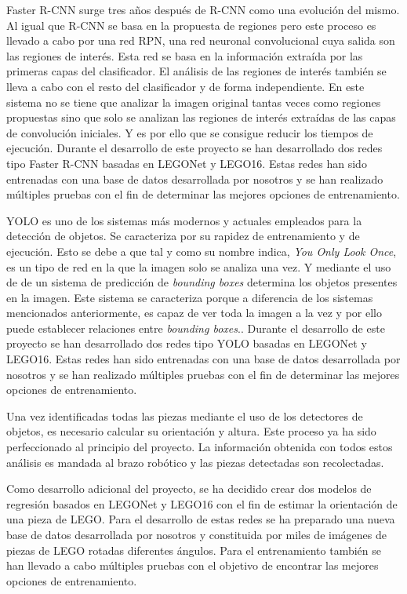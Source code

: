 {Faster R-CNN surge tres años después de R-CNN como una evolución del mismo. Al igual que R-CNN se basa en la propuesta de regiones pero este proceso es llevado a cabo por una red RPN, una red neuronal convolucional cuya salida son las regiones de interés. Esta red se basa en la información extraída por las primeras capas del clasificador. El análisis de las regiones de interés también se lleva a cabo con el resto del clasificador y de forma independiente. En este sistema no se tiene que analizar la imagen original tantas veces como regiones propuestas sino que solo se analizan las regiones de interés extraídas de las capas de convolución iniciales. Y es por ello que se consigue reducir los tiempos de ejecución. Durante el desarrollo de este proyecto se han desarrollado dos redes tipo Faster R-CNN basadas en LEGONet y LEGO16. Estas redes han sido entrenadas con una base de datos desarrollada por nosotros y se han realizado múltiples pruebas con el fin de determinar las mejores opciones de entrenamiento.

YOLO es uno de los sistemas más modernos y actuales empleados para la detección de objetos. Se caracteriza por su rapidez de entrenamiento y de ejecución. Esto se debe a que tal y como su nombre indica, \textit{You Only Look Once}, es un tipo de red en la que la imagen solo se analiza una vez. Y mediante el uso de de un sistema de predicción de \textit{bounding boxes} determina los objetos presentes en la imagen. Este sistema se caracteriza porque a diferencia de los sistemas mencionados anteriormente, es capaz de ver toda la imagen a la vez y por ello puede establecer relaciones entre \textit{bounding boxes}.. Durante el desarrollo de este proyecto se han desarrollado dos redes tipo YOLO basadas en LEGONet y LEGO16. Estas redes han sido entrenadas con una base de datos desarrollada por nosotros y se han realizado múltiples pruebas con el fin de determinar las mejores opciones de entrenamiento.

Una vez identificadas todas las piezas mediante el uso de los detectores de objetos, es necesario calcular su orientación y altura. Este proceso ya ha sido perfeccionado al principio del proyecto. La información obtenida con todos estos análisis es mandada al brazo robótico y las piezas detectadas son recolectadas.

Como desarrollo adicional del proyecto, se ha decidido crear dos modelos de regresión basados en LEGONet y LEGO16 con el fin de estimar la orientación de una pieza de LEGO. Para el desarrollo de estas redes se ha preparado una nueva base de datos desarrollada por nosotros y constituida por miles de imágenes de piezas de LEGO rotadas diferentes ángulos. Para el entrenamiento también se han llevado a cabo múltiples pruebas con el objetivo de encontrar las mejores opciones de entrenamiento.

}
